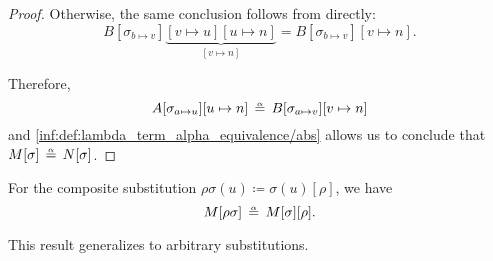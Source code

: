 \begin{proof}
  Otherwise, the same conclusion follows from  directly:
  \begin{equation*}
    B[\sigma_{b \mapsto v}]\underbrace{[v \mapsto u][u \mapsto n]}_{[v \mapsto n]} = B[\sigma_{b \mapsto v}][v \mapsto n].
  \end{equation*}

  Therefore,
  \begin{equation*}
    A[\sigma_{a \mapsto u}][u \mapsto n]
    \aequiv
    B[\sigma_{a \mapsto v}][v \mapsto n]
  \end{equation*}
  and \ref{inf:def:lambda_term_alpha_equivalence/abs} allows us to conclude that \( M[\sigma] \aequiv N[\sigma] \).
\end{proof}

\begin{proposition}\label{thm:substitution_composition_is_alpha_equivalent}
  For the composite substitution \( \rho\sigma(u) \coloneqq \sigma(u)[\rho] \), we have
  \begin{equation}\label{eq:thm:substitution_composition_is_alpha_equivalent}
    M[\rho\sigma] \aequiv M[\sigma][\rho].
  \end{equation}
\end{proposition}
\begin{comments}
  \item This result generalizes  to arbitrary substitutions.
\end{comments}
